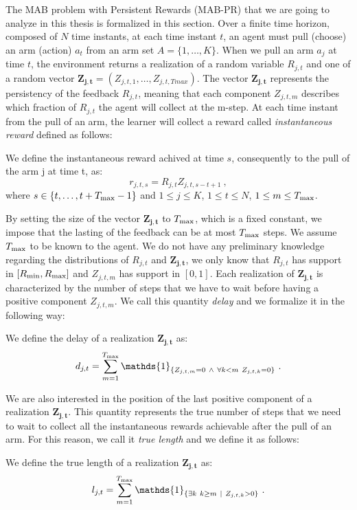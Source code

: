 The MAB problem with Persistent Rewards (MAB-PR) that we are going to analyze in this thesis is formalized in this section. Over a finite time horizon, composed of $N$ time instants, at each time instant $t$, an agent must pull (choose) an arm (action) $a_t$ from an arm set $A =\{1, \dots, K\} $. When we pull an arm $a_j$ at time $t$, the environment returns a realization of a random variable $R_{j,t}$ and one of a random vector $\boldsymbol{Z_{j,t}}= (Z_{j,t,1},\dots, Z_{j,t,Tmax})$. The vector $\boldsymbol{Z_{j,t}}$ represents the persistency of the feedback $R_{j,t}$, meaning that each component $Z_{j,t,m}$ describes which fraction of $R_{j,t}$ the agent will collect at the m-step. At each time instant from the pull of an arm, the learner will collect a reward called \emph{instantaneous reward} defined as follows:
\begin{definition}
	We define the instantaneous reward achived at time $s$, consequently to the pull of the arm j at time t, as:	
		$$r_{j,t,s} = R_{j,t} Z_{j,t,s-t+1} \ ,$$
where $s \in \{t,\dots,t+T_{\textnormal{max}}-1\}$ and $1\leq j \leq K$, $1\leq t \leq N$, $1\leq m \leq T_{\textnormal{max}}$.
\end{definition}
By setting the size of the vector $\boldsymbol{Z_{j,t}}$ to $T_{\textnormal{max}}$, which is a fixed constant, we impose that the lasting of the feedback can be at most $T_{\textnormal{max}}$ steps. We assume $T_{\textnormal{max}}$ to be known to the agent. We do not have any preliminary knowledge regarding the distributions of $R_{j,t}$ and $\boldsymbol{Z_{j,t}}$, we only know that $R_{j,t}$ has support in $[R_{\textnormal{min}},R_{\textnormal{max}}]$ and $Z_{j,t,m}$ has support in $[0,1]$. Each realization of $\boldsymbol{Z_{j,t}}$ is characterized by the number of steps that we have to wait before having a positive component $Z_{j,t,m}$. We call this quantity \emph{delay} and we formalize it in the following way:
\begin{definition}[Delay]
	We define the delay of a realization $\boldsymbol{Z_{j,t}}$ as:$$d_{j,t} = \sum_{m=1}^{\Tmax}\mathds{1}_{\{Z_{j,t,m}=0\ \wedge\ \forall k<m\ Z_{j,t,k} = 0\}}\ .$$

\end{definition}
We are also interested in the position of the last positive component of a realization $\boldsymbol{Z_{j,t}}$. This quantity represents the true number of steps that we need to wait to collect all the instantaneous rewards achievable after the pull of an arm. For this reason, we call it \emph{true length} and we define it as follows:
\begin{definition}
	We define the true length of a realization $\boldsymbol{Z_{j,t}}$ as:
		$$l_{j,t} = \sum_{m=1}^{\Tmax}\mathds{1}_{\{\exists k \ k\geq m \ \mid \ Z_{j,t,k} > 0\}} \ .$$
\end{definition}




